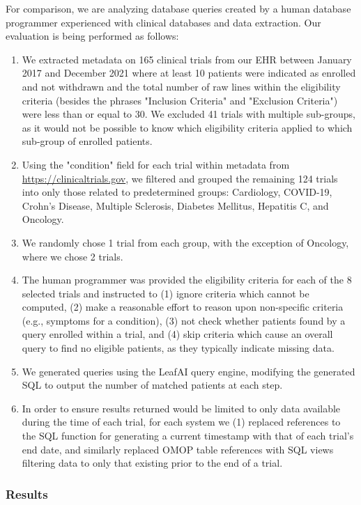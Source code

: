 \documentclass[../main.tex]{subfiles}
\begin{document}
For comparison, we are analyzing database queries created by a human database programmer experienced with clinical databases and data extraction. Our evaluation is being performed as follows:

\begin{enumerate}
    \item We extracted metadata on 165 clinical trials from our EHR between January 2017 and December 2021 where at least 10 patients were indicated as enrolled and not withdrawn and the total number of raw lines within the eligibility criteria (besides the phrases "Inclusion Criteria" and "Exclusion Criteria") were less than or equal to 30. We excluded 41 trials with multiple sub-groups, as it would not be possible to know which eligibility criteria applied to which sub-group of enrolled patients.
    \item Using the "condition" field for each trial within metadata from \url{https://clinicaltrials.gov}, we filtered and grouped the remaining 124 trials into only those related to predetermined groups: Cardiology, COVID-19, Crohn's Disease, Multiple Sclerosis, Diabetes Mellitus, Hepatitis C, and Oncology. 
    \item We randomly chose 1 trial from each group, with the exception of Oncology, where we chose 2 trials.
    \item The human programmer was provided the eligibility criteria for each of the 8 selected trials and instructed to (1) ignore criteria which cannot be computed, (2) make a reasonable effort to reason upon non-specific criteria (e.g., symptoms for a condition), (3) not check whether patients found by a query enrolled within a trial, and (4) skip criteria which cause an overall query to find no eligible patients, as they typically indicate missing data.
    \item We generated queries using the LeafAI query engine, modifying the generated SQL to output the number of matched patients at each step. 
    \item In order to ensure results returned would be limited to only data available during the time of each trial, for each system we (1) replaced references to the SQL function for generating a current timestamp with that of each trial's end date, and similarly replaced OMOP table references with SQL views filtering data to only that existing prior to the end of a trial.
\end{enumerate}

\subsubsection{Results}
\end{document}
